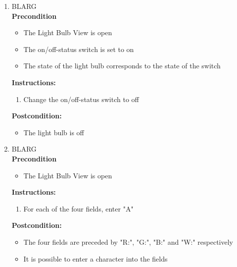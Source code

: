 \documentclass[a4paper]{article}
\newlength{\testlabellength}
\newenvironment{testlist}{\begin{enumerate}[label=\bfseries Instruction \thesubsection.\arabic* , labelindent=0pt, labelwidth=\testlabellength , leftmargin=2cm]}{\end{enumerate}}
\newenvironment{precondition}{
{\color{white}BLARG}\\ 
\textbf{Precondition}
\begin{itemize}[labelindent=0cm, labelwidth=2cm , leftmargin=1cm]
}
{\end{itemize}}
\newenvironment{instruction}{
\textbf{Instructions:}
\begin{enumerate}[label=\bfseries  \arabic*., labelindent=0cm, labelwidth=2cm , leftmargin=1cm]
}
{\end{enumerate}}
\newenvironment{postcondition}{
\textbf{Postcondition:}
\begin{itemize}[labelindent=0cm, labelwidth=2cm , leftmargin=1cm]
}
{\end{itemize}}
\begin{document}
\begin{appendices}
\begin{testlist}
	
	
	\item
		\begin{precondition}
			\item The Light Bulb View is open
			\item The on/off-status switch is set to on
			\item The state of the light bulb corresponds to the state of the switch
		\end{precondition}
    	\begin{instruction}
    		\item Change the on/off-status switch to off
    	\end{instruction}
    	\begin{postcondition}
    		\item The light bulb is off
    	\end{postcondition}  		
  
   
   	\item
   		\begin{precondition}
   			\item The Light Bulb View is open
		\end{precondition}
    	\begin{instruction}
    		\item For each of the four fields, enter "A"
    	\end{instruction}
    	\begin{postcondition}
    		\item The four fields are preceded by "R:", "G:", "B:" and "W:" respectively
    		\item It is possible to enter a character into the fields
    	\end{postcondition}




\end{testlist}
\end{appendices}
\end{document}
